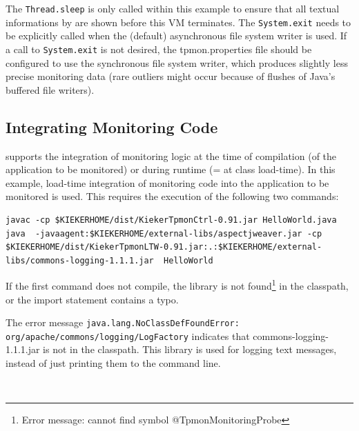 \documentclass[a4paper,12pt]{scrartcl}
\begin{document}
The \texttt{Thread.sleep} is only called within this example to ensure that all textual informations by \tpmon{} are shown before this VM terminates. The \texttt{System.exit} needs to be explicitly called when the (default) asynchronous file system writer is used. If a call to \texttt{System.exit} is not desired, the tpmon.properties file should be configured to use the synchronous file system writer, which produces slightly less precise monitoring data (rare outliers might occur because of flushes of Java's buffered file writers).

\subsection{Integrating Monitoring Code}
\tpmon{} supports the integration of monitoring logic at the time of compilation (of the application to be monitored) or during runtime (= at class load-time). In this example, load-time integration of monitoring code into the application to be monitored is used. This requires the execution of the following two commands:

\begin{lstlisting}[caption={Compilation and execution with AspectJ's Java agent.},label={javaHelloWorld}]
javac -cp $KIEKERHOME/dist/KiekerTpmonCtrl-0.91.jar HelloWorld.java
java  -javaagent:$KIEKERHOME/external-libs/aspectjweaver.jar -cp $KIEKERHOME/dist/KiekerTpmonLTW-0.91.jar:.:$KIEKERHOME/external-libs/commons-logging-1.1.1.jar  HelloWorld
\end{lstlisting}
If the first command does not compile, the \tpmon{} library is not found\footnote{Error message: cannot find symbol @TpmonMonitoringProbe} in the classpath, or the import statement contains a typo.

The error message \texttt{\small java.lang.NoClassDefFoundError:\\org/apache/commons/logging/LogFactory} indicates that commons-logging-1.1.1.jar is not in the classpath. This library is used for logging text messages, instead of just printing them to the command line.

\
\end{document}
